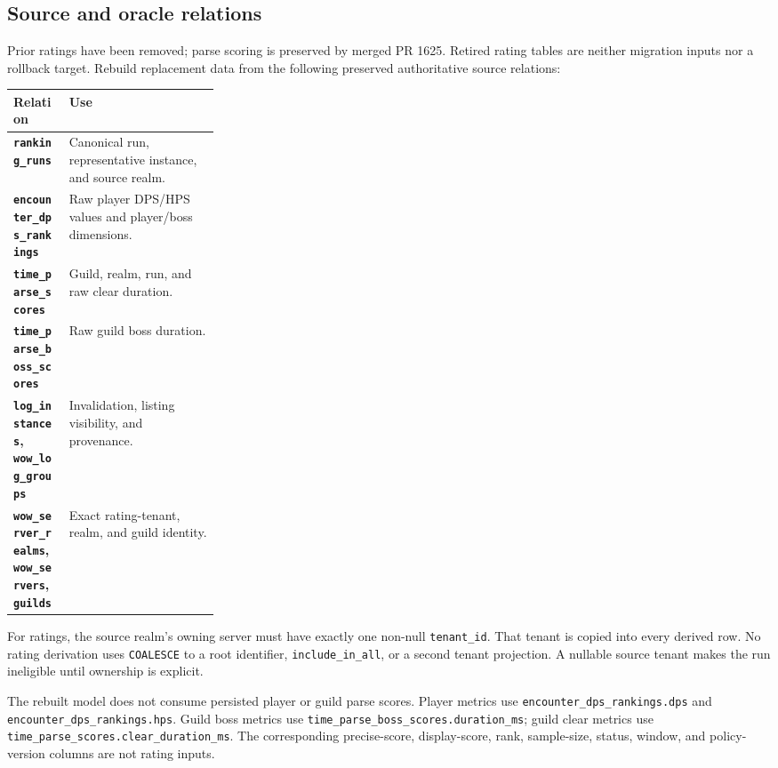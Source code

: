 \documentclass[11pt]{article}
\newcommand{\field}[1]{\texttt{#1}}
\begin{document}
\subsection{Source and oracle relations}
Prior ratings have been removed; parse scoring is preserved by merged PR 1625. Retired rating tables are neither migration inputs nor a rollback target. Rebuild replacement data from the following preserved authoritative source relations:
\begin{center}
\begin{tabularx}{\linewidth}{@{}>{\bfseries}p{0.27\linewidth}X@{}}
\toprule
Relation & Use \\
\midrule
\field{ranking\_\allowbreak runs} & Canonical run, representative instance, and source realm. \\
\field{encounter\_\allowbreak dps\_\allowbreak rankings} & Raw player DPS/HPS values and player/boss dimensions. \\
\field{time\_\allowbreak parse\_\allowbreak scores} & Guild, realm, run, and raw clear duration. \\
\field{time\_\allowbreak parse\_\allowbreak boss\_\allowbreak scores} & Raw guild boss duration. \\
\field{log\_\allowbreak instances}, \field{wow\_\allowbreak log\_\allowbreak groups} & Invalidation, listing visibility, and provenance. \\
\field{wow\_\allowbreak server\_\allowbreak realms}, \field{wow\_\allowbreak servers}, \field{guilds} & Exact rating-tenant, realm, and guild identity. \\
\bottomrule
\end{tabularx}
\end{center}

For ratings, the source realm's owning server must have exactly one non-null \field{tenant\_\allowbreak id}. That tenant is copied into every derived row. No rating derivation uses \field{COALESCE} to a root identifier, \field{include\_\allowbreak in\_\allowbreak all}, or a second tenant projection. A nullable source tenant makes the run ineligible until ownership is explicit.

The rebuilt model does not consume persisted player or guild parse scores. Player metrics use \field{encounter\_\allowbreak dps\_\allowbreak rankings.\allowbreak dps} and \field{encounter\_\allowbreak dps\_\allowbreak rankings.\allowbreak hps}. Guild boss metrics use \field{time\_\allowbreak parse\_\allowbreak boss\_\allowbreak scores.\allowbreak duration\_\allowbreak ms}; guild clear metrics use \field{time\_\allowbreak parse\_\allowbreak scores.\allowbreak clear\_\allowbreak duration\_\allowbreak ms}. The corresponding precise-score, display-score, rank, sample-size, status, window, and policy-version columns are not rating inputs.
\end{document}
